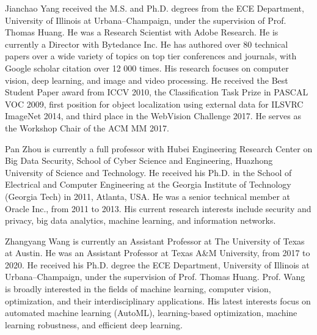 \documentclass[journal]{IEEEtran}
\begin{document}
\begin{IEEEbiography}
{Jianchao Yang} received the M.S. and Ph.D.
degrees from the ECE Department, University of
Illinois at Urbana–Champaign, under the supervision
of Prof. Thomas Huang. He was a Research Scientist with
Adobe Research. He is currently a Director with Bytedance Inc. He has authored over 80
technical papers over a wide variety of topics on top
tier conferences and journals, with Google scholar
citation over 12 000 times. His research focuses
on computer vision, deep learning, and image and
video processing. He received the Best Student Paper
award from ICCV 2010, the Classification Task Prize in PASCAL VOC 2009,
first position for object localization using external data for ILSVRC ImageNet
2014, and third place in the WebVision Challenge 2017. He serves as the
Workshop Chair of the ACM MM 2017.
\end{IEEEbiography}


\begin{IEEEbiography}
{Pan Zhou}
is currently a full professor with Hubei Engineering Research Center on Big Data Security, School of Cyber Science and Engineering, Huazhong University of Science and Technology. He received his Ph.D. in the School of Electrical and Computer Engineering at the Georgia Institute of Technology (Georgia Tech) in 2011, Atlanta, USA. He was a senior technical member at Oracle Inc., from 2011 to 2013. His current research interests include security and privacy, big data analytics, machine learning, and information networks.
\end{IEEEbiography}


\begin{IEEEbiography}
{Zhangyang Wang}
 is currently an Assistant Professor at The University of Texas at Austin. He was an Assistant
Professor  at Texas A\&M University, from 2017 to 2020. He received his Ph.D. degree the ECE Department, University of
Illinois at Urbana–Champaign, under the supervision
of Prof. Thomas Huang. Prof. Wang is broadly interested in the fields of machine learning, computer vision, optimization, and their interdisciplinary applications. His latest interests focus on automated machine learning (AutoML), learning-based optimization, machine learning robustness, and efficient deep learning.
\end{IEEEbiography}
\end{document}
